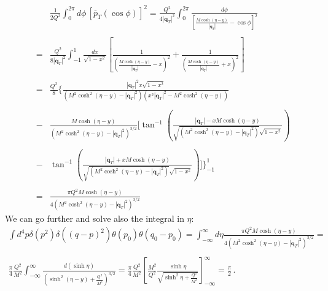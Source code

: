 \documentclass[10pt,a4paper]{article}
\begin{document}
\begin{equation}
\begin{array}{rcl}
&&\displaystyle
  \frac{1}{2Q^2}\int_0^{2\pi}d\phi\,[\overline{p}_T(\cos\phi)]^2 =
                                                                    \displaystyle
                                                                    \frac{Q^2}{4
                                                                    |\mathbf{q}_T|^2}\int_0^{2\pi}\frac{d\phi}{\left[\frac{M\cosh\left(\eta
                                                                    -
                                                                    y\right)}{|\mathbf{q}_T|}-\cos\phi\right]^2}\\
\\
&=&\displaystyle \frac{Q^2}{8|\mathbf{q}_T|^2}\int_{-1}^{1}\frac{dx}{\sqrt{1-x^2}}\left[\frac{1}{\left(\frac{M\cosh\left(\eta- y\right)}{|\mathbf{q}_T|}-x\right)^2}+\frac{1}{\left(\frac{M\cosh\left(\eta- y\right)}{|\mathbf{q}_T|}+x\right)^2}\right]\\
\\
&=&\displaystyle \frac{Q^2}{8}\Bigg\{\frac{|\mathbf{q}_T|^2 x\sqrt{1-x^2}}{(M ^2\cosh ^2\left(\eta- y\right)-|\mathbf{q}_T|^2)(x^2 |\mathbf{q}_T|^2-
  M ^2\cosh ^2\left(\eta- y\right))}\\
\\
&-&\displaystyle \frac{M\cosh\left(\eta-
    y\right)}{(M^2\cosh^2\left(\eta-
    y\right)-|\mathbf{q}_T|^2)^{3/2}}\Bigg[\tan^{-1}\left(\frac{|\mathbf{q}_T|-
    xM\cosh\left(\eta-y\right)}{\sqrt{(M^2\cosh^2\left(\eta-y\right)-|\mathbf{q}_T|^2)}\sqrt{1-x^2}}\right)\\
\\
&-&\displaystyle\tan^{-1}\left(\frac{|\mathbf{q}_T|+
    xM\cosh\left(\eta-y\right)}{\sqrt{(M^2\cosh^2\left(\eta-y\right)-|\mathbf{q}_T|^2)}\sqrt{1-x^2}}\right)\Bigg]\Bigg\}_{-1}^{1}\\
\\
&=&\displaystyle \frac{\pi
  Q^2M\cosh\left(\eta -
    y\right)}{4(M^2\cosh^2\left(\eta -
    y\right)-|\mathbf{q}_T|^2)^{3/2}}
\end{array}
\end{equation}
We can go further and solve also the integral in $\eta$:
\begin{equation}\label{eq:remarkableintegral}
\begin{array}{l}
  \displaystyle \int d^4p \delta(p^2) \delta((q-p)^2) \theta(p_{0})
  \theta(q_0-p_{0})=\int_{-\infty}^\infty
  d\eta\frac{\pi Q^2M\cosh(\eta-y)}{4(M^2\cosh^2(\eta-y)-|\mathbf{q}_T|^2)^{3/2}}= \\
  \\
  \displaystyle\frac{\pi }{4}\frac{Q^2}{M^2}\int_{-\infty}^\infty
  \frac{d(\sinh\eta)}{\left(\sinh^2(\eta-y)+\frac{Q^2}{M^2}\right)^{3/2}}= \frac{\pi}{4} \frac{Q^2}{M^2}\left[\frac{M^2}{Q^2}\frac{\sinh\eta}{\sqrt{\sinh^2\eta+\frac{Q^2}{M^2}}}\right]_{-\infty}^{\infty}= \frac{\pi}{2}\,.
\end{array}
\end{equation}
\end{document}
